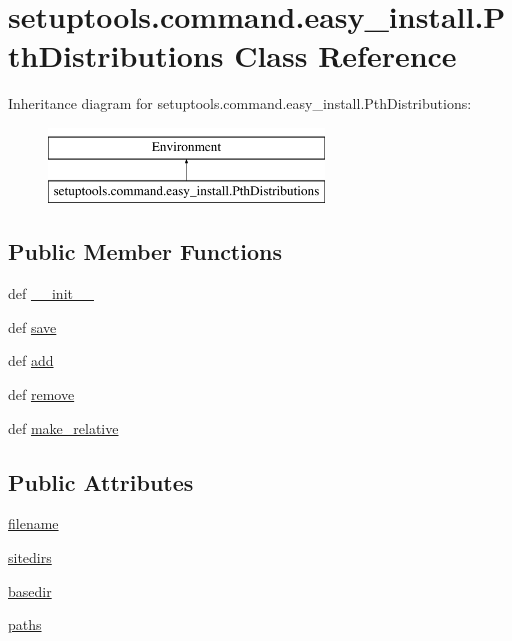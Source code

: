 \hypertarget{classsetuptools_1_1command_1_1easy__install_1_1PthDistributions}{}\section{setuptools.\+command.\+easy\+\_\+install.\+Pth\+Distributions Class Reference}
\label{classsetuptools_1_1command_1_1easy__install_1_1PthDistributions}
Inheritance diagram for setuptools.\+command.\+easy\+\_\+install.\+Pth\+Distributions\+:\begin{figure}[H]
\begin{center}
\leavevmode
\includegraphics[height=2.000000cm]{classsetuptools_1_1command_1_1easy__install_1_1PthDistributions}
\end{center}
\end{figure}
\subsection*{Public Member Functions}
\begin{DoxyCompactItemize}
\item 
def \hyperlink{classsetuptools_1_1command_1_1easy__install_1_1PthDistributions_ad7afa3ddb464f9bef99b69b598433769}{\+\_\+\+\_\+init\+\_\+\+\_\+}
\item 
def \hyperlink{classsetuptools_1_1command_1_1easy__install_1_1PthDistributions_ad4aec5724901574d7c2376febcdb98d0}{save}
\item 
def \hyperlink{classsetuptools_1_1command_1_1easy__install_1_1PthDistributions_a554aa1f0fa8c9549603e331759f81f17}{add}
\item 
def \hyperlink{classsetuptools_1_1command_1_1easy__install_1_1PthDistributions_a68ea70a0f3f8db1d9f1b89c483bc8fc1}{remove}
\item 
def \hyperlink{classsetuptools_1_1command_1_1easy__install_1_1PthDistributions_a0cc95130739072348e5b66810be443bd}{make\+\_\+relative}
\end{DoxyCompactItemize}
\subsection*{Public Attributes}
\begin{DoxyCompactItemize}
\item 
\hyperlink{classsetuptools_1_1command_1_1easy__install_1_1PthDistributions_ad28df9eb65540b9f423ed563a51eec10}{filename}
\item 
\hyperlink{classsetuptools_1_1command_1_1easy__install_1_1PthDistributions_a23bbbd0c5ba2b4108d346559451b5788}{sitedirs}
\item 
\hyperlink{classsetuptools_1_1command_1_1easy__install_1_1PthDistributions_a4ae0b9878f4e790842de737042c8e276}{basedir}
\item 
\hyperlink{classsetuptools_1_1command_1_1easy__install_1_1PthDistributions_aaeff84e1e64e746b8f64c993a7b23c4d}{paths}
\end{DoxyCompactItemize}
